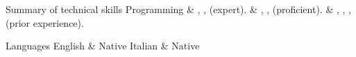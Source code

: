\documentclass[10pt]{article}
\begin{document}
\begin{cvsection}{Summary of technical skills}
Programming & , ,  (expert).\spacednewline
			& , ,  (proficient). \spacednewline
			& , , ,  (prior experience).
\end{cvsection}

\begin{cvsection}{Languages}
English & Native\spacednewline
Italian & Native
\end{cvsection}

\end{document}
